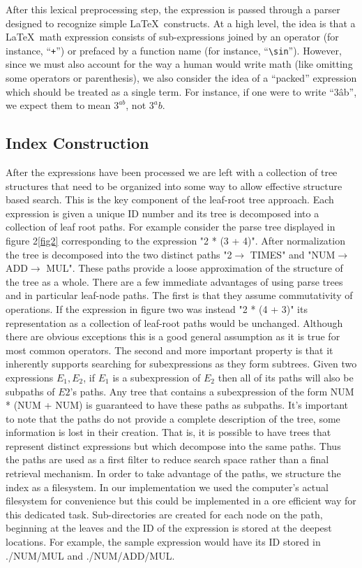 \documentclass{sig-alternate}
\begin{document}
After this lexical preprocessing step, the expression is passed through a parser designed to recognize simple \LaTeX\, constructs.  At a high level, the idea is that a \LaTeX\, math expression consists of sub-expressions joined by an operator (for instance, ``\texttt{+}'') or prefaced by a function name (for instance, ``\texttt{\textbackslash sin}'').  However, since we must also account for the way a human would write math (like omitting some operators or parenthesis), we also consider the idea of a ``packed'' expression which should be treated as a single term.  For instance, if one were to write ``3\^ab'', we expect them to mean $3^{ab}$, not $3^ab$. 

\subsection{Index Construction}
After the expressions have been processed we are left with a collection of tree structures that need to be organized into some way to allow effective structure based search. This is the key component of the leaf-root tree approach. Each expression is given a unique ID number and its tree is decomposed into a collection of leaf root paths. For example consider the parse tree displayed in figure 2\ref{fig2} corresponding to the expression "2 * (3 + 4)". After normalization the tree is decomposed into the two distinct paths "2$\rightarrow$ TIMES" and "NUM$\rightarrow$ ADD$\rightarrow$ MUL". These paths provide a loose approximation of the structure of the tree as a whole. 
There are a few immediate advantages of using parse trees and in particular leaf-node paths. The first is that they assume commutativity of operations. If the expression in figure two was instead "2 * (4 + 3)" its representation as a collection of leaf-root paths would be unchanged. Although there are obvious exceptions this is a good general assumption as it is true for most common operators.
The second and more important property is that it inherently supports searching for subexpressions as they
form subtrees. Given two expressions $E_1, E_2$, if $E_1$ is a subexpression of $E_2$ then all of its
paths will also be subpaths of $E2$'s paths. Any tree that contains a subexpression of the form NUM * (NUM + NUM) is guaranteed to have these paths as subpaths. 
It's important to note that the paths do not provide a complete description of the tree, some information is lost in their creation. That is, it is possible to have trees that represent distinct expressions but which decompose into the same paths. Thus the paths are used as a first filter to reduce search space rather than a final retrieval mechanism. In order to take advantage of the paths, we structure the index as a filesystem. In our implementation we used the computer's actual filesystem for convenience but this could be implemented in a ore efficient way for this dedicated task. Sub-directories are created for each node on the path, beginning at the leaves and the ID of the expression is stored at the deepest locations. For example, the sample expression would have its ID stored in ./NUM/MUL and ./NUM/ADD/MUL. 
\end{document}
